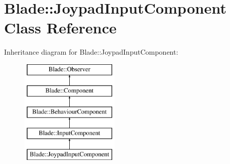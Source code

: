 \hypertarget{class_blade_1_1_joypad_input_component}{}\section{Blade\+:\+:Joypad\+Input\+Component Class Reference}
\label{class_blade_1_1_joypad_input_component}
Inheritance diagram for Blade\+:\+:Joypad\+Input\+Component\+:\begin{figure}[H]
\begin{center}
\leavevmode
\includegraphics[height=5.000000cm]{class_blade_1_1_joypad_input_component}
\end{center}
\end{figure}
